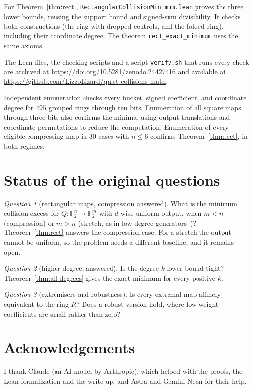 \documentclass[11pt]{article}
\theoremstyle{definition}
\theoremstyle{remark}
\newtheorem{question}{Question}
\newcommand{\F}{\mathbb{F}_2}
\begin{document}
For Theorem~\ref{thm:rect}, \texttt{RectangularCollisionMinimum.lean} proves
the three lower bounds, reusing the support bound and signed-sum divisibility.
It checks both constructions (the ring with dropped controls, and the folded
ring), including their coordinate degree. The theorem
\texttt{rect\_exact\_minimum} uses the same axioms.

The Lean files, the checking scripts and a script \texttt{verify.sh} that runs every
check are archived at \url{https://doi.org/10.5281/zenodo.24427416} and available at
\url{https://github.com/LizzoLizard/quiet-collisions-math}.

Independent enumeration checks every bucket, signed coefficient, and coordinate
degree for $495$ grouped rings through ten bits. Enumeration of all square maps
through three bits also confirms the minima, using output translations and
coordinate permutations to reduce the computation. Enumeration of every
eligible compressing map in $30$ cases with $n\le6$ confirms
Theorem~\ref{thm:rect}, in both regimes.


\section{Status of the original questions}

\begin{question}[rectangular maps, compression answered]
What is the minimum collision excess for $Q\colon\F^n\to\F^m$ with
$d$-wise uniform output, when $m<n$ (compression) or $m>n$ (stretch, as in
low-degree generators~\cite{MST06})? Theorem~\ref{thm:rect} answers the
compression case. For a stretch the output cannot be uniform, so the problem
needs a different baseline, and it remains open.
\end{question}

\begin{question}[higher degree, answered]
Is the degree-$k$ lower bound tight? Theorem~\ref{thm:all-degrees} gives the
exact minimum for every positive $k$.
\end{question}

\begin{question}[extremisers and robustness]
Is every extremal map affinely equivalent to the ring $R$? Does a robust version
hold, where low-weight coefficients are small rather than zero?
\end{question}

\section*{Acknowledgements}
I thank Claude (an AI model by Anthropic), which helped with the proofs, the
Lean formalization and the write-up, and Astra and Gemini Neon for their help.
\end{document}
